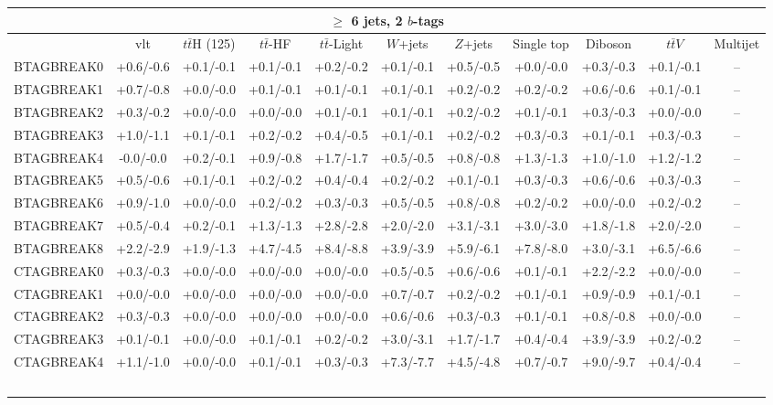 \begin{tabular}{l*{10}{c}}
\multicolumn{11}{c}{$\geq$ 6 jets, 2 $b$-tags}\\
\hline\hline
 & vlt & $t\bar{t}$H (125) & $t\bar{t}$-HF & $t\bar{t}$-Light & $W$+jets & $Z$+jets & Single top & Diboson & $t\bar{t}$$V$ & Multijet\\
\hline
BTAGBREAK0 & +0.6/-0.6 & +0.1/-0.1 & +0.1/-0.1 & +0.2/-0.2 & +0.1/-0.1 & +0.5/-0.5 & +0.0/-0.0 & +0.3/-0.3 & +0.1/-0.1 & --\\
BTAGBREAK1 & +0.7/-0.8 & +0.0/-0.0 & +0.1/-0.1 & +0.1/-0.1 & +0.1/-0.1 & +0.2/-0.2 & +0.2/-0.2 & +0.6/-0.6 & +0.1/-0.1 & --\\
BTAGBREAK2 & +0.3/-0.2 & +0.0/-0.0 & +0.0/-0.0 & +0.1/-0.1 & +0.1/-0.1 & +0.2/-0.2 & +0.1/-0.1 & +0.3/-0.3 & +0.0/-0.0 & --\\
BTAGBREAK3 & +1.0/-1.1 & +0.1/-0.1 & +0.2/-0.2 & +0.4/-0.5 & +0.1/-0.1 & +0.2/-0.2 & +0.3/-0.3 & +0.1/-0.1 & +0.3/-0.3 & --\\
BTAGBREAK4 & -0.0/-0.0 & +0.2/-0.1 & +0.9/-0.8 & +1.7/-1.7 & +0.5/-0.5 & +0.8/-0.8 & +1.3/-1.3 & +1.0/-1.0 & +1.2/-1.2 & --\\
BTAGBREAK5 & +0.5/-0.6 & +0.1/-0.1 & +0.2/-0.2 & +0.4/-0.4 & +0.2/-0.2 & +0.1/-0.1 & +0.3/-0.3 & +0.6/-0.6 & +0.3/-0.3 & --\\
BTAGBREAK6 & +0.9/-1.0 & +0.0/-0.0 & +0.2/-0.2 & +0.3/-0.3 & +0.5/-0.5 & +0.8/-0.8 & +0.2/-0.2 & +0.0/-0.0 & +0.2/-0.2 & --\\
BTAGBREAK7 & +0.5/-0.4 & +0.2/-0.1 & +1.3/-1.3 & +2.8/-2.8 & +2.0/-2.0 & +3.1/-3.1 & +3.0/-3.0 & +1.8/-1.8 & +2.0/-2.0 & --\\
BTAGBREAK8 & +2.2/-2.9 & +1.9/-1.3 & +4.7/-4.5 & +8.4/-8.8 & +3.9/-3.9 & +5.9/-6.1 & +7.8/-8.0 & +3.0/-3.1 & +6.5/-6.6 & --\\
CTAGBREAK0 & +0.3/-0.3 & +0.0/-0.0 & +0.0/-0.0 & +0.0/-0.0 & +0.5/-0.5 & +0.6/-0.6 & +0.1/-0.1 & +2.2/-2.2 & +0.0/-0.0 & --\\
CTAGBREAK1 & +0.0/-0.0 & +0.0/-0.0 & +0.0/-0.0 & +0.0/-0.0 & +0.7/-0.7 & +0.2/-0.2 & +0.1/-0.1 & +0.9/-0.9 & +0.1/-0.1 & --\\
CTAGBREAK2 & +0.3/-0.3 & +0.0/-0.0 & +0.0/-0.0 & +0.0/-0.0 & +0.6/-0.6 & +0.3/-0.3 & +0.1/-0.1 & +0.8/-0.8 & +0.0/-0.0 & --\\
CTAGBREAK3 & +0.1/-0.1 & +0.0/-0.0 & +0.1/-0.1 & +0.2/-0.2 & +3.0/-3.1 & +1.7/-1.7 & +0.4/-0.4 & +3.9/-3.9 & +0.2/-0.2 & --\\
CTAGBREAK4 & +1.1/-1.0 & +0.0/-0.0 & +0.1/-0.1 & +0.3/-0.3 & +7.3/-7.7 & +4.5/-4.8 & +0.7/-0.7 & +9.0/-9.7 & +0.4/-0.4 & --\\
$$
\end{tabular}
